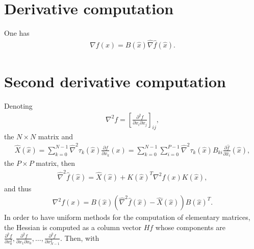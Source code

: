 \documentclass[a4paper,11pt,english]{sphinxmanual}
\begin{document}
\section{Derivative computation}
\label{\detokenize{project/appendixA:derivative-computation}}
One has
\begin{equation*}
\begin{split}\nabla f(x) = B(\widehat{x})\widehat{\nabla} \widehat{f}(\widehat{x}).\end{split}
\end{equation*}

\section{Second derivative computation}
\label{\detokenize{project/appendixA:second-derivative-computation}}
Denoting
\begin{equation*}
\begin{split}\nabla^2 f =
\left[\frac{\partial^2 f}{\partial x_i \partial x_j}\right]_{ij},\end{split}
\end{equation*}
the \(N \times N\) matrix and
\begin{equation*}
\begin{split}\widehat{X}(\widehat{x}) =
\sum_{k = 0}^{N-1}\widehat{\nabla}^2\tau_k(\widehat{x})\frac{\partial f}{\partial x_k}(x) =
\sum_{k = 0}^{N-1}\sum_{i = 0}^{P-1}
\widehat{\nabla}^2\tau_k(\widehat{x})B_{ki}\frac{\partial \widehat{f}}{\partial \widehat{x}_i}(\widehat{x}),\end{split}
\end{equation*}
the \(P \times P\) matrix, then
\begin{equation*}
\begin{split}\widehat{\nabla}^2 \widehat{f}(\widehat{x}) = \widehat{X}(\widehat{x}) + K(\widehat{x})^T \nabla^2 f(x) K(\widehat{x}),\end{split}
\end{equation*}
and thus
\begin{equation*}
\begin{split}\nabla^2 f(x) = B(\widehat{x})(\widehat{\nabla}^2 \widehat{f}(\widehat{x}) - \widehat{X}(\widehat{x})) B(\widehat{x})^T.\end{split}
\end{equation*}
In order to have uniform methods for the computation of elementary matrices, the
Hessian is computed as a column vector \(H f\) whose components are
\(\frac{\partial^2 f}{\partial x^2_0}, \frac{\partial^2 f}{\partial
x_1\partial x_0},\ldots, \frac{\partial^2 f}{\partial x^2_{N-1}}\). Then, with
\end{document}
